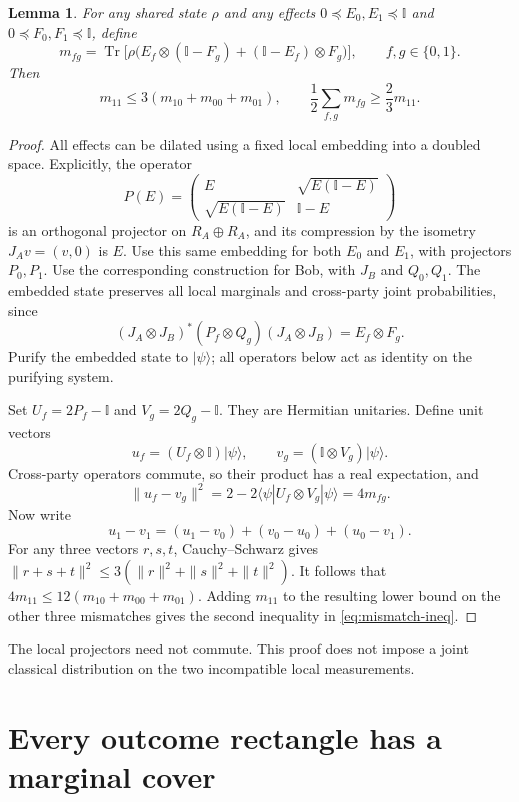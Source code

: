 \documentclass[11pt,letterpaper]{article}
\newtheorem{lemma}[theorem]{Lemma}
\theoremstyle{remark}\newtheorem{remark}[theorem]{Remark}
\newcommand{\Tr}{\operatorname{Tr}}
\newcommand{\I}{\mathbb I}
\newcommand{\ket}[1]{\lvert#1\rangle}
\begin{document}
\begin{lemma}\label{lem:mismatch}
For any shared state $\rho$ and any effects
$0\preceq E_0,E_1\preceq\I$ and $0\preceq F_0,F_1\preceq\I$, define
\begin{equation}\label{eq:mismatch}
 m_{fg}=\Tr\bigl[\rho\bigl(E_f\otimes(\I-F_g)
                              +(\I-E_f)\otimes F_g\bigr)\bigr],
 \qquad f,g\in\{0,1\}.
\end{equation}
Then
\begin{equation}\label{eq:mismatch-ineq}
 m_{11}\le3(m_{10}+m_{00}+m_{01}),\qquad
 \frac12\sum_{f,g}m_{fg}\ge\frac23m_{11}.
\end{equation}
\end{lemma}
\begin{proof}
All effects can be dilated using a fixed local embedding into a doubled space. Explicitly, the operator
\[
 P(E)=\begin{pmatrix}
 E&\sqrt{E(\I-E)}\\
 \sqrt{E(\I-E)}&\I-E
 \end{pmatrix}
\]
is an orthogonal projector on $R_A\oplus R_A$, and its compression by the isometry $J_Av=(v,0)$ is $E$. Use this same embedding for both $E_0$ and $E_1$, with projectors $P_0,P_1$. Use the corresponding construction for Bob, with $J_B$ and $Q_0,Q_1$. The embedded state preserves all local marginals and cross-party joint probabilities, since
\[
 (J_A\otimes J_B)^*(P_f\otimes Q_g)(J_A\otimes J_B)=E_f\otimes F_g.
\]
Purify the embedded state to $\ket\psi$; all operators below act as identity on the purifying system.

Set $U_f=2P_f-\I$ and $V_g=2Q_g-\I$. They are Hermitian unitaries. Define unit vectors
\[
 u_f=(U_f\otimes\I)\ket\psi,\qquad
 v_g=(\I\otimes V_g)\ket\psi.
\]
Cross-party operators commute, so their product has a real expectation, and
\[
 \|u_f-v_g\|^2
 =2-2\langle\psi|U_f\otimes V_g|\psi\rangle
 =4m_{fg}.
\]
Now write
\[
 u_1-v_1=(u_1-v_0)+(v_0-u_0)+(u_0-v_1).
\]
For any three vectors $r,s,t$, Cauchy--Schwarz gives
$\|r+s+t\|^2\le3(\|r\|^2+\|s\|^2+\|t\|^2)$.
It follows that
$4m_{11}\le12(m_{10}+m_{00}+m_{01})$.
Adding $m_{11}$ to the resulting lower bound on the other three mismatches gives the second inequality in \eqref{eq:mismatch-ineq}.
\end{proof}

The local projectors need not commute. This proof does not impose a joint classical distribution on the two incompatible local measurements.

\section{Every outcome rectangle has a marginal cover}\label{sec:covers}
\end{document}
